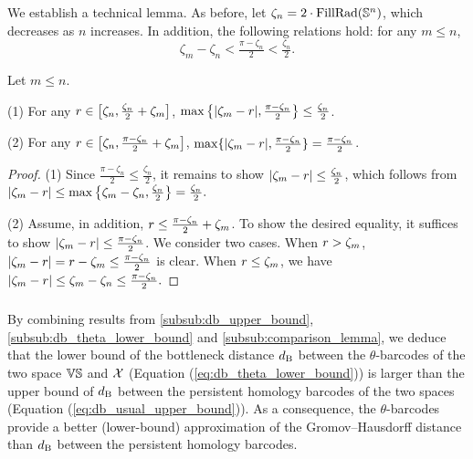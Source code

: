 We establish a technical lemma.
As before, let $\zeta_n = 2 \cdot \operatorname{FillRad}(\mathbb{S}^n)$, which decreases as $n$ increases.
In addition, the following relations hold: for any $m \leq n$,
\[\zeta_m - \zeta_n < \tfrac{\pi - \zeta_n}{2} < \tfrac{\zeta_n}{2}.\]

\medskip\lemma
Let $m \leq n$.

(1) For any $r \in \big[\zeta_n, \tfrac{\zeta_n}{2}+\zeta_m\big]$, $\max\big\{|\zeta_m  - r |, \tfrac{\pi - \zeta_n}{2}\big\} \leq \tfrac{\zeta_n}{2}$.

(2) For any $r \in \big[\zeta_n, \tfrac{\pi - \zeta_n}{2} + \zeta_m\big]$, $\max\{|\zeta_m  - r |, \tfrac{\pi - \zeta_n}{2}\} = \tfrac{\pi - \zeta_n}{2}$.

\begin{proof}
    	(1) Since $\tfrac{\pi - \zeta_n}{2} \leq \tfrac{\zeta_n}{2}$, it remains to show $|\zeta_m  - r | \leq \tfrac{\zeta_n}{2}$, which follows from
    	\(
    	|\zeta_m  - r | \leq \max\big\{\zeta_m - \zeta_n, \tfrac{\zeta_n}{2}\big\} = \tfrac{\zeta_n}{2}.
    	\)

    	(2) Assume, in addition, $r \leq \tfrac{\pi - \zeta_n}{2} + \zeta_m$.
        To show the desired equality, it suffices to show $|\zeta_m  - r | \leq \tfrac{\pi - \zeta_n}{2}$.
        We consider two cases.
        When $r > \zeta_m$,
    	$|\zeta_m  - r | = r - \zeta_m \leq
        \tfrac{\pi - \zeta_n}{2}
    	$ is clear.
    	When $r \leq \zeta_m$, we have
    	\(
    	|\zeta_m  - r | \leq \zeta_m - \zeta_n
    	\leq \tfrac{\pi - \zeta_n}{2}.
    	\)
\end{proof}

\subsubsection{}
By combining results from \cref{subsub:db_upper_bound}, \cref{subsub:db_theta_lower_bound} and \cref{subsub:comparison_lemma}, we deduce that the lower bound of the bottleneck distance $d_{\mathrm{B}}$ between the $\theta$-barcodes of the two space $\mathbb{V}\mathbb{S}$ and $\mathcal{X}$ (Equation (\ref{eq:db_theta_lower_bound})) is larger than the upper bound of $d_{\mathrm{B}}$ between the persistent homology barcodes of the two spaces (Equation (\ref{eq:db_usual_upper_bound})).
As a consequence, the $\theta$-barcodes provide a better (lower-bound) approximation of the Gromov--Hausdorff distance than $d_{\mathrm{B}}$ between the persistent homology barcodes.

